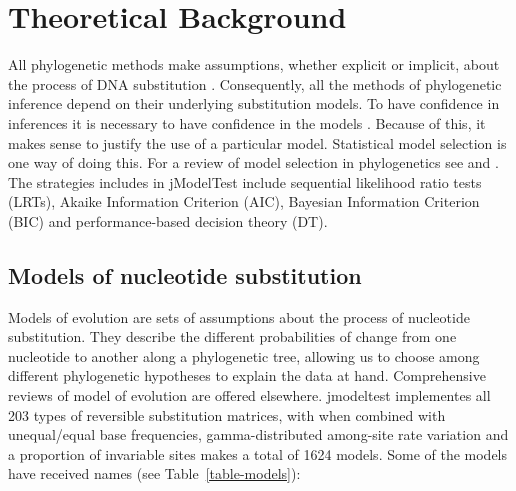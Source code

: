 \section{Theoretical Background}

All phylogenetic methods make assumptions, whether explicit or implicit, about the process of DNA substitution \citep{Felsenstein-1988}. Consequently, all the methods of phylogenetic inference depend on their underlying substitution models. To have confidence in inferences it is necessary to have confidence in the models \citep{Goldman-1993b}. Because of this, it makes sense to justify the use of a particular model. Statistical model selection is one way of doing this. For a review of model selection in phylogenetics see \citet{Sullivan-2005} and \citet{Johnson-2003}. The strategies includes in jModelTest include sequential likelihood ratio tests (LRTs), Akaike Information Criterion (AIC), Bayesian Information Criterion (BIC) and performance-based decision theory (DT).


\subsection{Models of nucleotide substitution}

Models of evolution are sets of assumptions about the process of nucleotide substitution. They describe the different probabilities of change from one nucleotide to another along a phylogenetic tree, allowing us to choose among different phylogenetic hypotheses to explain the data at hand. Comprehensive reviews of model of evolution are offered elsewhere. jmodeltest implementes all 203 types of reversible substitution matrices, with when combined with unequal/equal base frequencies, gamma-distributed among-site rate variation and a proportion of invariable sites makes a total of 1624 models. Some of the models have received names (see Table~\ref{table-models}):

